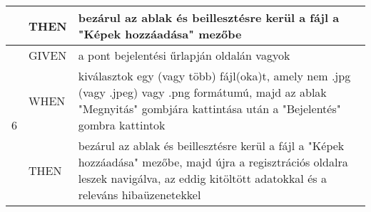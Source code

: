 \begin{center}
\begin{longtable}{ | m{}| m{} | m{} | }
		\cline{2-3} 
		& THEN & bezárul az ablak és beillesztésre kerül a fájl a "Képek hozzáadása" mezőbe \\
		\hline
		\multirow{3}{*}{6} & GIVEN & a pont bejelentési űrlapján oldalán vagyok \\
		\cline{2-3}
		& WHEN & kiválasztok egy (vagy több) fájl(oka)t, amely nem .jpg (vagy .jpeg) vagy .png formátumú, majd az ablak "Megnyitás" gombjára kattintása után a "Bejelentés" gombra kattintok \\
		\cline{2-3} 
		& THEN & bezárul az ablak és beillesztésre kerül a fájl a "Képek hozzáadása" mezőbe, majd újra a regisztrációs oldalra leszek navigálva, az eddig kitöltött adatokkal és a releváns hibaüzenetekkel \\
		\hline
	\end{longtable}
	\label{tab:sim_trash_create}
\end{center}

